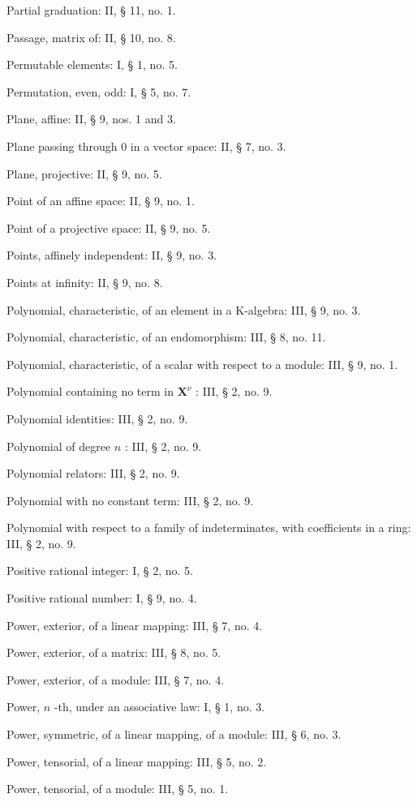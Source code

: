 Partial graduation: II, § 11, no. 1.

Passage, matrix of: II, § 10, no. 8.

Permutable elements: I, § 1, no. 5.

Permutation, even, odd: I, § 5, no. 7.

Plane, affine: II, § 9, nos. 1 and 3.

Plane passing through 0 in a vector space: II, § 7, no. 3.

Plane, projective: II, § 9, no. 5.

Point of an affine space: II, § 9, no. 1.

Point of a projective space: II, § 9, no. 5.

Points, affinely independent: II, § 9, no. 3.

Points at infinity: II, § 9, no. 8.

Polynomial, characteristic, of an element in a K-algebra: III, § 9, no. 3.

Polynomial, characteristic, of an endomorphism: III, § 8, no. 11.

Polynomial, characteristic, of a scalar with respect to a module: III, § 9, no. 1.

Polynomial containing no term in \(\mathbf{X}^{\nu}\) : III, § 2, no. 9.

Polynomial identities: III, § 2, no. 9.

Polynomial of degree \(n\) : III, § 2, no. 9.

Polynomial relators: III, § 2, no. 9.

Polynomial with no constant term: III, § 2, no. 9.

Polynomial with respect to a family of indeterminates, with coefficients in a ring: III, § 2, no. 9.

Positive rational integer: I, § 2, no. 5.

Positive rational number: I, § 9, no. 4.

Power, exterior, of a linear mapping: III, § 7, no. 4.

Power, exterior, of a matrix: III, § 8, no. 5.

Power, exterior, of a module: III, § 7, no. 4.

Power, \(n\) -th, under an associative law: I, § 1, no. 3.

Power, symmetric, of a linear mapping, of a module: III, § 6, no. 3.

Power, tensorial, of a linear mapping: III, § 5, no. 2.

Power, tensorial, of a module: III, § 5, no. 1.

